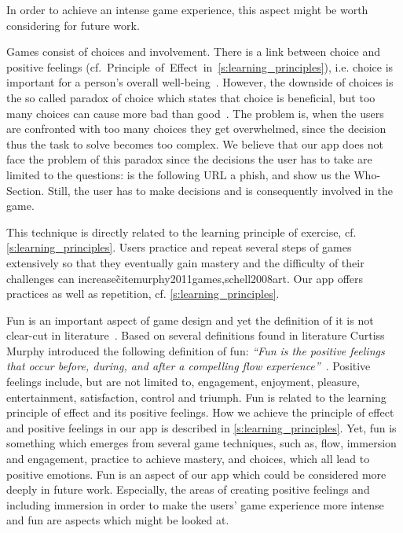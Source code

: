 \begin{description}[leftmargin=0cm]
In order to achieve an intense game experience, this aspect might be worth considering for future work.
	\item[Choice and Involvement:]
Games consist of choices and involvement. 
There is a link between choice and positive feelings (cf.~Principle~of~Effect~in~\autoref{s:learning_principles}), i.e. choice is important for a person's overall well-being~\cite{seligman2012flourish, schwartz2009paradox}.
However, the downside of choices is the so called paradox of choice which states that choice is beneficial, but too many choices can cause more bad than good~\cite{schwartz2009paradox}.
The problem is, when the users are confronted with too many choices they get overwhelmed, since the decision thus the task to solve becomes too complex.
We believe that our app does not face the problem of this paradox since the decisions the user has to take are limited to the questions:
is the following URL a phish, and show us the Who-Section.
Still, the user has to make decisions and is consequently involved in the game.
	\item[Practice:] This technique is directly related to the learning principle of exercise, cf. \autoref{s:learning_principles}. 
Users practice and repeat several steps of games extensively so that they eventually gain mastery and the difficulty of their challenges can increase\~cite{murphy2011games,schell2008art}. 
Our app offers practices as well as repetition, cf. \autoref{s:learning_principles}.
	\item[Fun:] Fun is an important aspect of game design and yet the definition of it is not clear-cut in literature~\cite{murphy2011games, schell2008art,koster2010theory}.
Based on several definitions found in literature Curtiss Murphy introduced the following definition of fun: \textit{``Fun is the positive feelings that occur before, during, and after a compelling flow experience''}~\cite{murphy2011games}.
Positive feelings include, but are not limited to, engagement, enjoyment, pleasure, entertainment, satisfaction, control and triumph. 
Fun is related to the learning principle of effect and its positive feelings.
How we achieve the principle of effect and positive feelings in our app is described in \autoref{s:learning_principles}.
Yet, fun is something which emerges from several game techniques, such as, flow, immersion and engagement, practice to achieve mastery, and choices, which all lead to positive emotions.
Fun is an aspect of our app which could be considered more deeply in future work. 
Especially, the areas of creating positive feelings and including immersion in order to make the users' game experience more intense and fun are aspects which might be looked at.
\end{description}